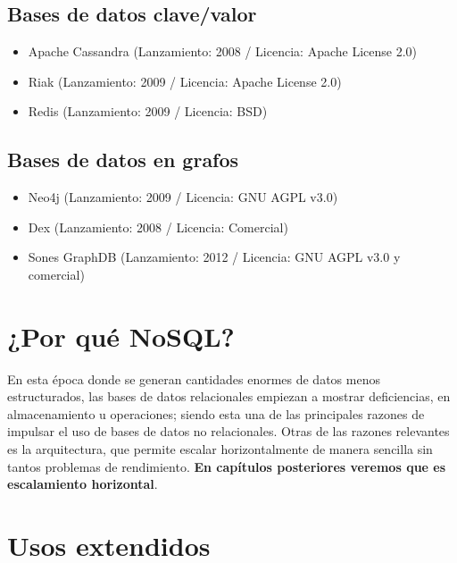 \subsection*{Bases de datos clave/valor}

\begin{itemize}
\item Apache Cassandra (Lanzamiento: 2008 / Licencia: Apache License 2.0)
\item Riak (Lanzamiento: 2009 / Licencia: Apache License 2.0)
\item Redis (Lanzamiento: 2009 / Licencia: BSD)
\end{itemize}

\subsection*{Bases de datos en grafos}

\begin{itemize}
\item Neo4j (Lanzamiento: 2009 / Licencia: GNU AGPL v3.0)
\item Dex (Lanzamiento: 2008 / Licencia: Comercial)
\item Sones GraphDB (Lanzamiento: 2012 / Licencia: GNU AGPL v3.0 y comercial)
\end{itemize}

\section{¿Por qu\'e NoSQL?}

En esta \'epoca donde se generan cantidades enormes de datos menos estructurados, las bases de datos relacionales empiezan a mostrar deficiencias, en almacenamiento u operaciones; siendo esta una de las principales razones de impulsar el uso de bases de datos no relacionales. Otras de las razones relevantes es la arquitectura, que permite escalar horizontalmente de manera sencilla sin tantos problemas de rendimiento. \textbf{En cap\'itulos posteriores veremos que es escalamiento horizontal}.

\section{Usos extendidos}
